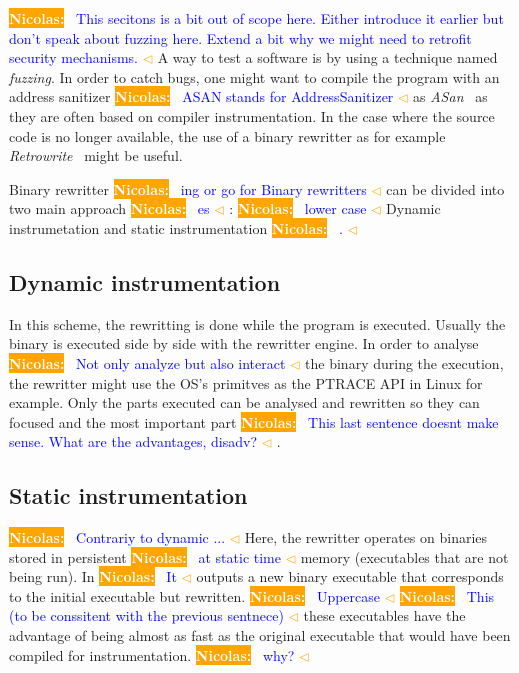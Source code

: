 \documentclass[a4paper,11pt,oneside]{report}
\newcommand{\todobox}[3]{%
	\colorbox{#1}{\textcolor{white}{\sffamily\bfseries\scriptsize #2}}%
	~\textcolor{blue}{#3} %
	\textcolor{#1}{$\triangleleft$}%
}
\newcommand{\nb}[1]{\todobox{orange}{Nicolas:}{#1}}
\begin{document}
\nb{This secitons is a bit out of scope here. Either introduce it earlier but
don't speak about fuzzing here. Extend a bit why we might need to retrofit
security mechanisms.}A way to test a software is by using a technique named
\textit{fuzzing}. In
order to catch bugs, one might want to compile the program with an address
sanitizer \nb{ASAN stands for AddressSanitizer}as \textit{ASan}~\cite{ASan} as they are often based on compiler instrumentation.
In the case where the source code is no longer available, the use of a binary
rewritter as for example \textit{Retrowrite}~\cite{dinesh20oakland} might be useful.

Binary rewritter\nb{ing or go for Binary rewritters} can be divided into two
main approach\nb{es}: \nb{lower case}Dynamic instrumetation
and static instrumentation \nb{.}

\subsection{Dynamic instrumentation}
In this scheme, the rewritting is done while the program is executed. Usually
the binary is executed side by side with the rewritter engine. In order
to analyse \nb{Not only analyze but also interact} the binary during the execution, the rewritter might use the OS's
primitves as the PTRACE API in Linux for example.  Only the parts executed can
be analysed and rewritten so they can focused and the most important
part\nb{This last sentence doesnt make sense. What are the advantages, disadv?}.

\subsection{Static instrumentation}
\nb{Contrariy to dynamic ...}Here, the rewritter operates on binaries stored in
persistent \nb{at static time } memory
(executables that are not being run). In\nb{It} outputs a new binary executable that
corresponds to the initial executable but rewritten. \nb{Uppercase}\nb{This (to
be conssitent with the previous sentnece)}these executables have the
advantage of being almost as fast as the original executable that would have
been compiled for instrumentation.\nb{why?}
\end{document}
